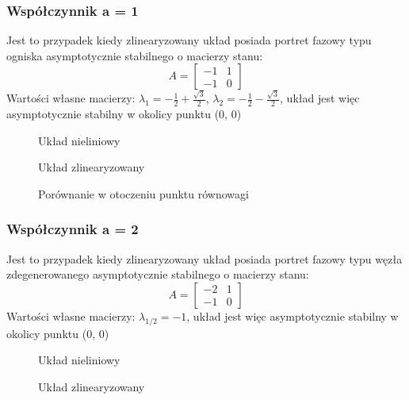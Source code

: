 \documentclass[a4paper, 10pt]{article}
\begin{document}
			\subsubsection{Współczynnik a = 1}
				Jest to przypadek kiedy zlinearyzowany układ posiada portret fazowy typu ogniska asymptotycznie stabilnego o macierzy stanu:
				$$
				A = \begin{bmatrix}
					-1 & 1 \\
					-1 & 0
				\end{bmatrix}
				$$
				Wartości własne macierzy: $\lambda_1 = -\frac{1}{2} + \frac{\sqrt{3}}{2}$, $\lambda_2 = -\frac{1}{2} - \frac{\sqrt{3}}{2}$, układ jest więc asymptotycznie stabilny w okolicy punktu (0, 0)
				\begin{figure}[H]
					\centering
					\def \svgwidth{0.8\columnwidth}
					
					\caption{Układ nieliniowy}
				\end{figure}\noindent


				\begin{figure}[H]
					\centering
					\def \svgwidth{0.8\columnwidth}
					
					\caption{Układ zlinearyzowany}
				\end{figure}\noindent

				\begin{figure}[H]
					\centering
					\def \svgwidth{0.8\columnwidth}
					
					\caption{Porównanie w otoczeniu punktu równowagi}
				\end{figure}\noindent
			\subsubsection{Współczynnik a = 2}
					Jest to przypadek kiedy zlinearyzowany układ posiada portret fazowy typu węzła zdegenerowanego asymptotycznie stabilnego o macierzy stanu:
					$$
					A = \begin{bmatrix}
					-2 & 1 \\
					-1 & 0
					\end{bmatrix}
					$$
					Wartości własne macierzy: $\lambda_{1/2} = -1$, układ jest więc asymptotycznie stabilny w okolicy punktu (0, 0)
				\begin{figure}[H]
					\centering
					\def \svgwidth{0.8\columnwidth}
					
					\caption{Układ nieliniowy}
				\end{figure}\noindent
				
				\begin{figure}[H]
					\centering
					\def \svgwidth{0.8\columnwidth}
					
					\caption{Układ zlinearyzowany}
				\end{figure}\noindent
				
\end{document}
